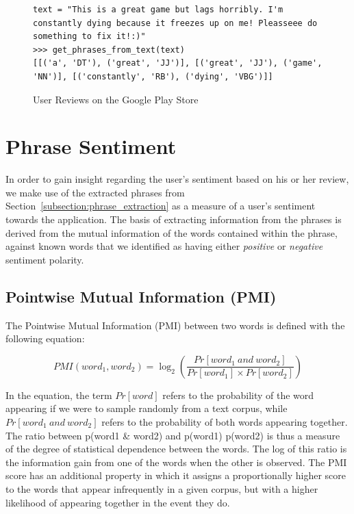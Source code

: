 \documentclass[11pt]{report} %
\begin{document}
\begin{figure}[h!]
  \centering
\begin{lstlisting}
text = "This is a great game but lags horribly. I'm constantly dying because it freezes up on me! Pleasseee do something to fix it!:)"
>>> get_phrases_from_text(text)
[[('a', 'DT'), ('great', 'JJ')], [('great', 'JJ'), ('game', 'NN')], [('constantly', 'RB'), ('dying', 'VBG')]]

\end{lstlisting}
 \caption{User Reviews on the Google Play Store}
\label{fig:phrase_extraction}
\end{figure}

\section{Phrase Sentiment}
\label{section:phrase_sentiment}
In order to gain insight regarding the user's sentiment based on his or her review, we make use of the extracted phrases from 
Section~\ref{subsection:phrase_extraction} as a measure of a user's sentiment towards the application. The basis of extracting information from the phrases is derived from the mutual information of the words contained within the phrase, against known words that we identified as having either \textit{positive} or \textit{negative} sentiment polarity. 

\subsection{Pointwise Mutual Information (PMI)}
The Pointwise Mutual Information (PMI) between two words \cite{church1990} is defined with the following equation:

\begin{equation*} PMI(word_1, word_2) = \log_2 \left(\frac{Pr[word_1 \: and \: word_2]}{Pr[word_1] \times Pr[word_2]}\right) \end{equation*}

In the equation, the term $Pr[word]$ refers to the probability of the word appearing if we were to sample randomly from a text corpus, while  $Pr[word_1 \: and \: word_2]$ refers to the probability of both words appearing together. The ratio between p(word1 \& word2) and p(word1) p(word2) is thus a measure of the degree of statistical dependence between the words. The log of this ratio is the information gain from one of the words when the other is observed. The PMI score has an additional property in which it assigns a proportionally higher score to the words that appear infrequently in a given corpus, but with a higher likelihood of appearing together in the event they do. \cite{Vargas2010} 
\end{document}
